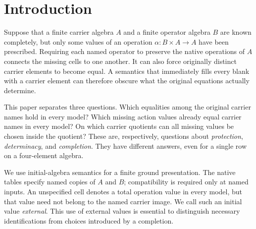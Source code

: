 \section{Introduction}\label{sec:introduction}

Suppose that a finite carrier algebra $A$ and a finite operator algebra $B$
are known completely, but only some values of an operation
$\alpha:B\times A\to A$ have been prescribed. Requiring each named operator
to preserve the native operations of $A$ connects the missing cells to one
another. It can also force originally distinct carrier elements to become
equal. A semantics that immediately fills every blank with a carrier element
can therefore obscure what the original equations actually determine.

This paper separates three questions. Which equalities among the original
carrier names hold in every model? Which missing action values already equal
carrier names in every model? On which carrier quotients can all missing
values be chosen inside the quotient? These are, respectively, questions
about \emph{protection}, \emph{determinacy}, and \emph{completion}.
They have different answers, even for a single row on a four-element algebra.

We use initial-algebra semantics for a finite ground presentation. The native
tables specify named copies of $A$ and $B$; compatibility is required only at
named inputs. An unspecified cell denotes a total operation value in every
model, but that value need not belong to the named carrier image. We call
such an initial value \emph{external}. This use of external values is
essential to distinguish necessary identifications from choices introduced
by a completion.

